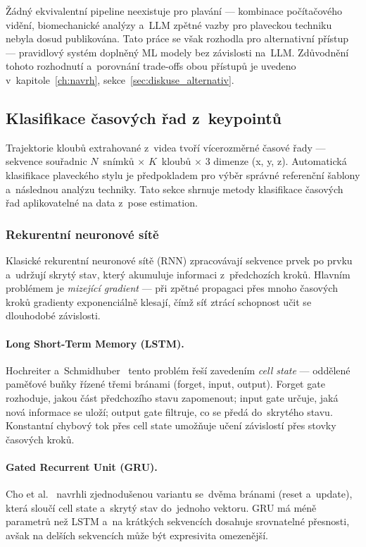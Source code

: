 Žádný ekvivalentní pipeline neexistuje pro plavání --- kombinace počítačového vidění, biomechanické analýzy a~LLM zpětné vazby pro plaveckou techniku nebyla dosud publikována. Tato práce se však rozhodla pro alternativní přístup --- pravidlový systém doplněný ML modely bez závislosti na~LLM. Zdůvodnění tohoto rozhodnutí a~porovnání trade-offs obou přístupů je uvedeno v~kapitole~\ref{ch:navrh}, sekce~\ref{sec:diskuse_alternativ}.

\subsection{Klasifikace časových řad z~keypointů}
\label{subsec:klasifikace_casovych_rad}

Trajektorie kloubů extrahované z~videa tvoří vícerozměrné časové řady --- sekvence souřadnic $N$~snímků $\times$ $K$~kloubů $\times$ 3 dimenze (x, y, z). Automatická klasifikace plaveckého stylu je předpokladem pro výběr správné referenční šablony a~následnou analýzu techniky. Tato sekce shrnuje metody klasifikace časových řad aplikovatelné na data z~pose estimation.

\subsubsection{Rekurentní neuronové sítě}
\label{subsubsec:rnn}

Klasické rekurentní neuronové sítě (RNN) zpracovávají sekvence prvek po prvku a~udržují skrytý stav, který akumuluje informaci z~předchozích kroků. Hlavním problémem je \emph{mizející gradient} --- při zpětné propagaci přes mnoho časových kroků gradienty exponenciálně klesají, čímž síť ztrácí schopnost učit se dlouhodobé závislosti.

\paragraph{Long Short-Term Memory (LSTM).}
Hochreiter a~Schmidhuber~\cite{hochreiter1997lstm} tento problém řeší zavedením \emph{cell state} --- oddělené paměťové buňky řízené třemi bránami (forget, input, output). Forget gate rozhoduje, jakou část předchozího stavu zapomenout; input gate určuje, jaká nová informace se uloží; output gate filtruje, co se předá do~skrytého stavu. Konstantní chybový tok přes cell state umožňuje učení závislostí přes stovky časových kroků.

\paragraph{Gated Recurrent Unit (GRU).}
Cho et al.~\cite{cho2014gru} navrhli zjednodušenou variantu se~dvěma bránami (reset a~update), která sloučí cell state a~skrytý stav do~jednoho vektoru. GRU má méně parametrů než LSTM a~na krátkých sekvencích dosahuje srovnatelné přesnosti, avšak na delších sekvencích může být expresivita omezenější.

